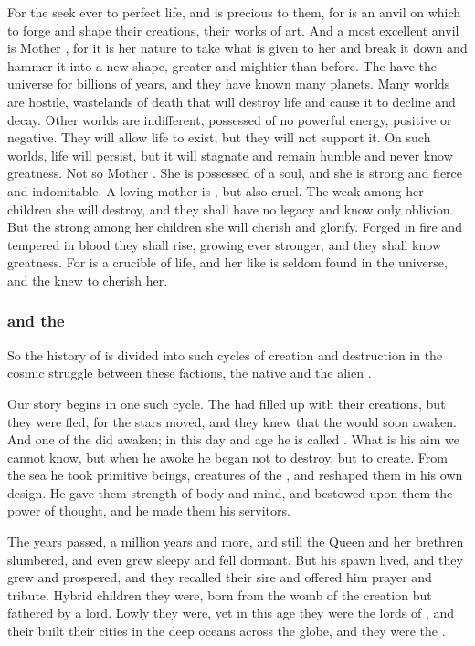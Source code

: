 For the \voyagers{} seek ever to perfect life, and \Miith{} is precious to them, for \Miith{} is an anvil on which to forge and shape their creations, their works of art. And a most excellent anvil is Mother \Miith{}, for it is her nature to take what is given to her and break it down and hammer it into a new shape, greater and mightier than before. The \voyagers{} have \travelled the universe for billions of years, and they have known many planets. Many worlds are hostile, wastelands of death that will destroy life and cause it to decline and decay. Other worlds are indifferent, possessed of no powerful energy, positive or negative. They will allow life to exist, but they will not support it. On such worlds, life will persist, but it will stagnate and remain humble and never know greatness. Not so Mother \Miith{}. She is possessed of a soul, and she is strong and fierce and indomitable. A loving mother is \Miith{}, but also cruel. The weak among her children she will destroy, and they shall have no legacy and know only oblivion. But the strong among her children she will cherish and glorify. Forged in fire and tempered in blood they shall rise, growing ever stronger, and they shall know greatness. For \Miith{} is a crucible of life, and her like is seldom found in the universe, and the \voyagers{} knew to cherish her. 





\subsubsection{\Moroch{} and the \nagae}
So the history of \Miith{} is divided into such cycles of creation and destruction in the cosmic struggle between these factions, the native \krakens{} and the alien \voyagers{}. 

Our story begins in one such cycle. The \voyagers{} had filled \Miith{} up with their creations, but they were fled, for the stars moved, and they knew that the \krakens{} would soon awaken. And one of the \krakens{} did awaken; in this day and age he is called \Moroch{}. What is his aim we cannot know, but when he awoke he began not to destroy, but to create. From the sea he took primitive beings, creatures of the \voyagers{}, and reshaped them in his own design. He gave them strength of body and mind, and bestowed upon them the power of thought, and he made them his servitors. 

The years passed, a million years and more, and still the \Kraken{} Queen and her brethren slumbered, and even \Moroch{} grew sleepy and fell dormant. But his spawn lived, and they grew and prospered, and they recalled their sire and offered him prayer and tribute. Hybrid children they were, born from the womb of the \psp{\voyagers} creation but fathered by a \kraken{} lord. Lowly they were, yet in this age they were the lords of \Miith{}, and their built their cities in the deep oceans across the globe, and they were the \nagae{}. 















